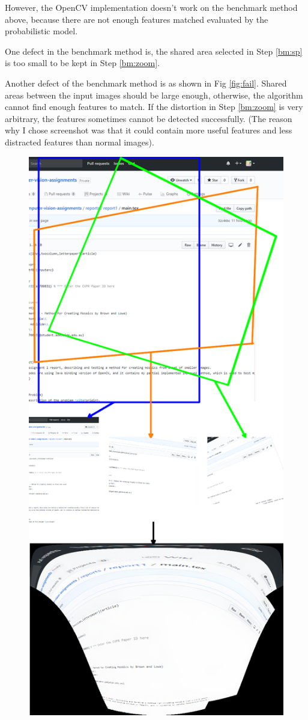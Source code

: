 \documentclass[10pt,twocolumn,letterpaper]{article}
\begin{document}
However, the OpenCV implementation doesn't work on the benchmark method above, because there are not enough features matched evaluated by the probabilistic model.

One defect in the benchmark method is, the shared area selected in Step \ref{bm:sp} is too small to be kept in Step \ref{bm:zoom}.

Another defect of the benchmark method is as shown in Fig \ref{fig:fail}.
Shared areas between the input images should be large enough, otherwise, the algorithm cannot find enough features to match.
If the distortion in Step \ref{bm:zoom} is very arbitrary, the features sometimes cannot be detected successfully.
(The reason why I chose screenshot was that it could contain more useful features and less distracted features than normal images).

\begin{figure}[t]
    \begin{center}
        \includegraphics[width=0.9\linewidth]{fail}

\end{center}
\end{figure}
\end{document}
